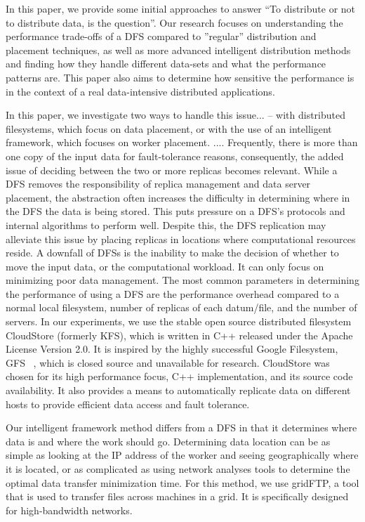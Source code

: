 \documentclass{rspublic}
\newcommand{\micnote}[1]{ {\textcolor{blue} { ***Michael: #1 }}}
\newcommand{\betynote}[1]{ {\textcolor{orange} { ***Bety: #1 }}}
\newcommand{\jhanote}[1]{} \newcommand{\micnote}[1]{}\newcommand{\betynote}[1]{} \newcommand{\fixme}[1]{}
\begin{document}
In this paper, we provide some initial approaches to answer ``To
distribute or not to distribute data, is the question''. Our research
focuses on understanding the performance trade-offs of a DFS compared
to ''regular'' distribution and placement techniques, as well as more
advanced intelligent distribution methods and finding how they handle
different data-sets and what the performance patterns are. This paper
also aims to determine how sensitive the performance is in the context
of a real data-intensive distributed applications.

\jhanote{Move to later section; not in introduction} In this paper, we
investigate two ways to handle this issue... \jhanote{which issue?} --
with distributed filesystems, which focus on data placement, or with
the use of an intelligent framework, which focuses on worker
placement.  .... Frequently, there is more than one copy of the input data
for fault-tolerance reasons, consequently, the added issue of deciding
between the two or more replicas becomes relevant.  While a DFS
removes the responsibility of replica management and data server
placement, the abstraction often increases the difficulty in
determining where in the DFS the data is being stored. This puts
pressure on a DFS's protocols and internal algorithms to perform
well. Despite this, the DFS replication may alleviate this issue by
placing replicas in locations where computational resources reside. A
downfall of DFSs is the inability to make the decision of whether to
move the input data, or the computational workload. It can only focus
on minimizing poor data management. The most common parameters in
determining the performance of using a DFS are the performance
overhead compared to a normal local filesystem, number of replicas of
each datum/file, and the number of servers. In our experiments, we use
the stable open source distributed filesystem CloudStore (formerly
KFS), which is written in C++ released under the Apache License
Version 2.0. It is inspired by the highly successful Google
Filesystem, GFS ~\citep{cloudstore_web}, which is closed source and
unavailable for research. CloudStore was chosen for its high
performance focus, C++ implementation, and its source code
availability. It also provides a means to automatically replicate data
on different hosts to provide efficient data access and fault
tolerance.

Our intelligent framework method differs from a DFS in that it
determines where data is and where the work should go.  Determining
data location can be as simple as looking at the IP address of the
worker and seeing geographically where it is located, or as
complicated as using network analyses tools to determine the optimal
data transfer minimization time.  For this method, we use
gridFTP\jhanote{place proper citation for gridftp}, a tool that is
used to transfer files across machines in a grid. It is specifically
designed for high-bandwidth networks.
\end{document}
